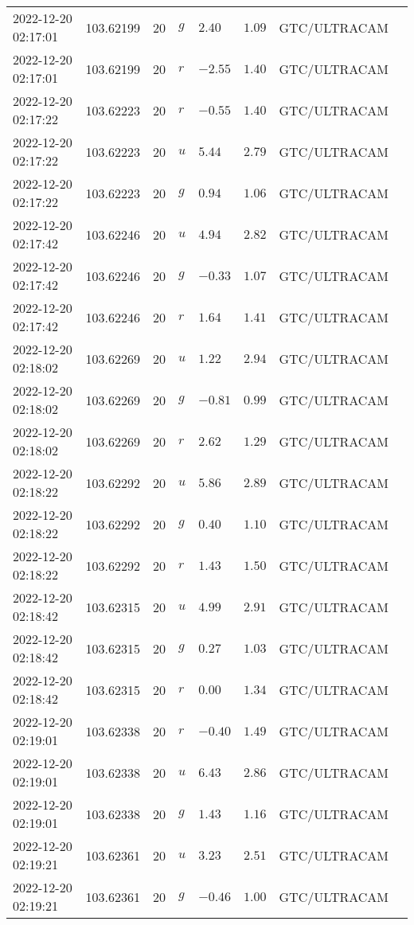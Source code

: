 \documentclass{nature_plusfigure}
\begin{document}
\begin{supplement}
\begin{center}
\begin{longtable}{llllllll}
2022-12-20 02:17:01 & 103.62199 & 20 & $g$ & $2.40$ & $1.09$ & GTC/ULTRACAM &  \\ 
2022-12-20 02:17:01 & 103.62199 & 20 & $r$ & $-2.55$ & $1.40$ & GTC/ULTRACAM &  \\ 
2022-12-20 02:17:22 & 103.62223 & 20 & $r$ & $-0.55$ & $1.40$ & GTC/ULTRACAM &  \\ 
2022-12-20 02:17:22 & 103.62223 & 20 & $u$ & $5.44$ & $2.79$ & GTC/ULTRACAM &  \\ 
2022-12-20 02:17:22 & 103.62223 & 20 & $g$ & $0.94$ & $1.06$ & GTC/ULTRACAM &  \\ 
2022-12-20 02:17:42 & 103.62246 & 20 & $u$ & $4.94$ & $2.82$ & GTC/ULTRACAM &  \\ 
2022-12-20 02:17:42 & 103.62246 & 20 & $g$ & $-0.33$ & $1.07$ & GTC/ULTRACAM &  \\ 
2022-12-20 02:17:42 & 103.62246 & 20 & $r$ & $1.64$ & $1.41$ & GTC/ULTRACAM &  \\ 
2022-12-20 02:18:02 & 103.62269 & 20 & $u$ & $1.22$ & $2.94$ & GTC/ULTRACAM &  \\ 
2022-12-20 02:18:02 & 103.62269 & 20 & $g$ & $-0.81$ & $0.99$ & GTC/ULTRACAM &  \\ 
2022-12-20 02:18:02 & 103.62269 & 20 & $r$ & $2.62$ & $1.29$ & GTC/ULTRACAM &  \\ 
2022-12-20 02:18:22 & 103.62292 & 20 & $u$ & $5.86$ & $2.89$ & GTC/ULTRACAM &  \\ 
2022-12-20 02:18:22 & 103.62292 & 20 & $g$ & $0.40$ & $1.10$ & GTC/ULTRACAM &  \\ 
2022-12-20 02:18:22 & 103.62292 & 20 & $r$ & $1.43$ & $1.50$ & GTC/ULTRACAM &  \\ 
2022-12-20 02:18:42 & 103.62315 & 20 & $u$ & $4.99$ & $2.91$ & GTC/ULTRACAM &  \\ 
2022-12-20 02:18:42 & 103.62315 & 20 & $g$ & $0.27$ & $1.03$ & GTC/ULTRACAM &  \\ 
2022-12-20 02:18:42 & 103.62315 & 20 & $r$ & $0.00$ & $1.34$ & GTC/ULTRACAM &  \\ 
2022-12-20 02:19:01 & 103.62338 & 20 & $r$ & $-0.40$ & $1.49$ & GTC/ULTRACAM &  \\ 
2022-12-20 02:19:01 & 103.62338 & 20 & $u$ & $6.43$ & $2.86$ & GTC/ULTRACAM &  \\ 
2022-12-20 02:19:01 & 103.62338 & 20 & $g$ & $1.43$ & $1.16$ & GTC/ULTRACAM &  \\ 
2022-12-20 02:19:21 & 103.62361 & 20 & $u$ & $3.23$ & $2.51$ & GTC/ULTRACAM &  \\ 
2022-12-20 02:19:21 & 103.62361 & 20 & $g$ & $-0.46$ & $1.00$ & GTC/ULTRACAM &  \\ 

\end{longtable}
\end{center}
\end{supplement}
\end{document}
